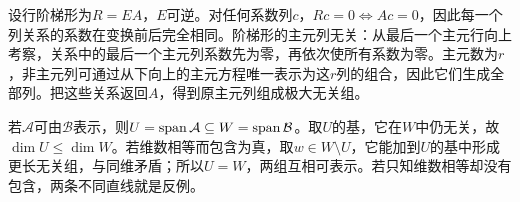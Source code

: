 \label{der:3-2}
设行阶梯形为$R=EA$，$E$可逆。对任何系数列$c$，$Rc=0\Longleftrightarrow Ac=0$，因此每一个列关系的系数在变换前后完全相同。阶梯形的主元列无关：从最后一个主元行向上考察，关系中的最后一个主元列系数先为零，再依次使所有系数为零。主元数为$r$，非主元列可通过从下向上的主元方程唯一表示为这$r$列的组合，因此它们生成全部列。把这些关系返回$A$，得到原主元列组成极大无关组。

若$\mathcal A$可由$\mathcal B$表示，则$U=\operatorname{span}\mathcal A\subseteq W=\operatorname{span}\mathcal B$。取$U$的基，它在$W$中仍无关，故$\dim U\le\dim W$。若维数相等而包含为真，取$w\in W\setminus U$，它能加到$U$的基中形成更长无关组，与同维矛盾；所以$U=W$，两组互相可表示。若只知维数相等却没有包含，两条不同直线就是反例。
